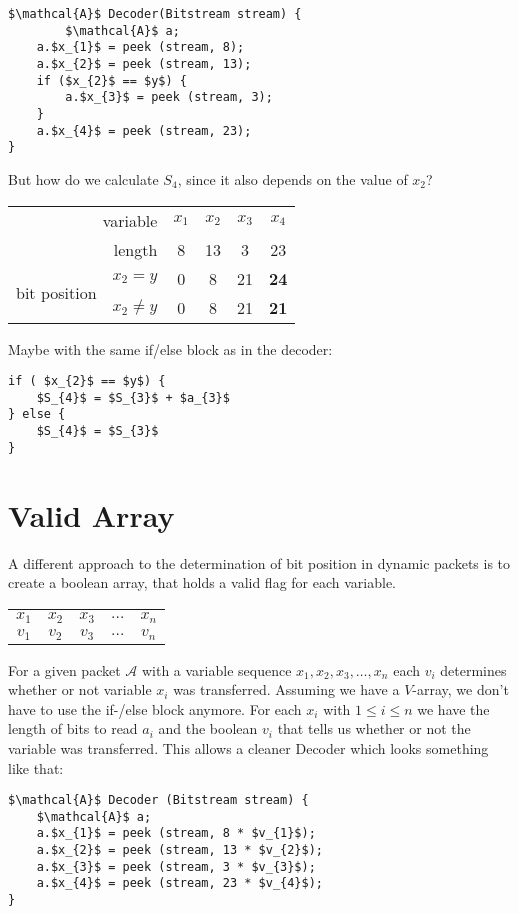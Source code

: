 \documentclass[parskip=half,paper=a4,DIV=13]{scrartcl}
\begin{document}
\begin{lstlisting}[mathescape]
$\mathcal{A}$ Decoder(Bitstream stream) {
        $\mathcal{A}$ a;
	a.$x_{1}$ = peek (stream, 8);
	a.$x_{2}$ = peek (stream, 13);
	if ($x_{2}$ == $y$) {
		a.$x_{3}$ = peek (stream, 3);
	}
	a.$x_{4}$ = peek (stream, 23);
}
\end{lstlisting}

But how do we calculate $S_{4}$, since it also depends on the value of $x_{2}$?

\begin{center}
\begin{tabular}{l r | cccc}
	\multicolumn{2}{r|}{variable} &$x_{1}$ &$x_{2}$ &$x_{3}$ &$x_{4}$\\
	\multicolumn{2}{r|}{length} &8 &13 &3 &23\\
	\multirow{2}{*}{bit position} &$x_{2} = y$  &0 &8 &21 &\bf{24}\\
	 &$x_{2} \neq y$  &0 &8 &21 &\bf{21}
\end{tabular}
\end{center}

Maybe with the same if/else block as in the decoder:

\begin{lstlisting}[mathescape]
if ( $x_{2}$ == $y$) {
	$S_{4}$ = $S_{3}$ + $a_{3}$
} else {
	$S_{4}$ = $S_{3}$
}
\end{lstlisting}

\section{Valid Array}

A different approach to the determination of bit position in dynamic packets is to create a boolean array, that holds a valid flag for each variable.
\begin{center}
\begin{tabular}{ccccc}
	$x_{1}$ &$x_{2}$ &$x_{3}$ &$\ldots$ &$x_{n}$\\
	$v_{1}$ &$v_{2}$ &$v_{3}$ &$\ldots$ &$v_{n}$	
\end{tabular}
\end{center}
For a given packet $\mathcal{A}$ with a variable sequence $x_{1}, x_{2}, x_{3}, \ldots , x_{n}$ each $v_{i}$ determines whether or not variable $x_{i}$ was transferred.
Assuming we have a $V$-array, we don't have to use the if-/else block anymore.
For each $x_{i}$ with $1\leq i\leq n$ we have the length of bits to read $a_{i}$ and the boolean $v_{i}$ that tells us whether or not the variable was transferred.
This allows a cleaner Decoder which looks something like that:
\begin{lstlisting}[mathescape]
$\mathcal{A}$ Decoder (Bitstream stream) {
	$\mathcal{A}$ a;
	a.$x_{1}$ = peek (stream, 8 * $v_{1}$);
	a.$x_{2}$ = peek (stream, 13 * $v_{2}$);
	a.$x_{3}$ = peek (stream, 3 * $v_{3}$);
	a.$x_{4}$ = peek (stream, 23 * $v_{4}$);
}
\end{lstlisting}
\end{document}
